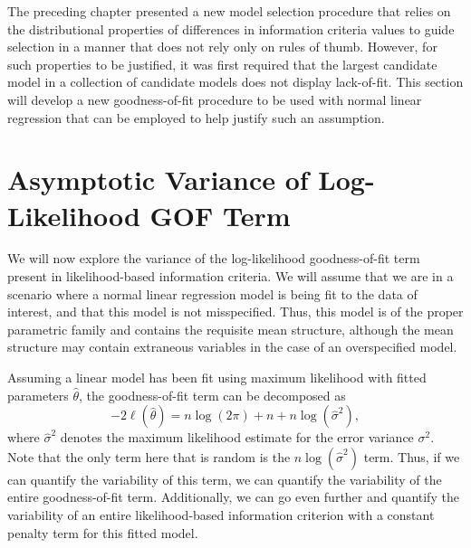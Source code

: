 \doublespace
{}

	The preceding chapter presented a new model selection procedure that relies on the distributional properties of differences in information criteria values to guide
	selection in a manner that does not rely only on rules of thumb. However, for such properties to be justified, it was first required that the largest candidate model
	in a collection of candidate models does not display lack-of-fit. This section will develop a new goodness-of-fit procedure to be used with normal linear regression
	that can be employed to help justify such an assumption.
		
		\section{Asymptotic Variance of Log-Likelihood GOF Term} \label{sec:asymp_var}

		We will now explore the variance of the log-likelihood goodness-of-fit term present in likelihood-based information criteria. We will assume that we are in a
		scenario where a normal linear regression model is being fit to the data of interest, and that this model is not misspecified. Thus, this model is of the proper
		parametric family and contains the requisite mean structure, although the mean structure may contain extraneous variables in the
		case of an overspecified model.

		Assuming a linear model has been fit using maximum likelihood with fitted parameters $\hat{\theta}$, the goodness-of-fit term can be decomposed as
		\begin{equation}
			-2 \ell (\hat{\theta}  ) = n \log(2 \pi) + n + n \log(\hat{\sigma}^2 ) ,
		\end{equation}
		where $\hat{\sigma}^2$ denotes the maximum likelihood estimate for the error variance $\sigma^2$. Note that the only term here that is random is
		the $n \log(\hat{\sigma}^2)$ term. Thus, if we can quantify the variability of this term, we can quantify the variability of the entire goodness-of-fit
		term. Additionally, we can go even further and quantify the variability of an entire likelihood-based information criterion with a constant penalty
		term for this fitted model.

